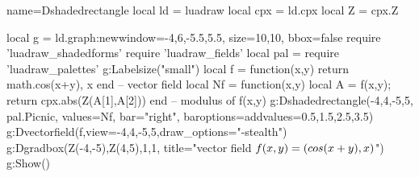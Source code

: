 \begin{luadraw}{name=Dshadedrectangle}
local ld = luadraw
local cpx = ld.cpx
local Z = cpx.Z

local g = ld.graph:new{window={-4,6,-5.5,5.5}, size={10,10}, bbox=false}
require 'luadraw_shadedforms'
require 'luadraw_fields'
local pal = require 'luadraw_palettes'
g:Labelsize("small")
local f = function(x,y) return {math.cos(x+y), x} end -- vector field
local Nf = function(x,y) local A = f(x,y); return cpx.abs(Z(A[1],A[2])) end -- modulus of f(x,y)
g:Dshadedrectangle(-4,4,-5,5, pal.Picnic, {values=Nf, bar="right", baroptions={addvalues={0.5,1.5,2.5,3.5}}})
g:Dvectorfield(f,{view={-4,4,-5,5},draw_options="-stealth"})
g:Dgradbox({Z(-4,-5),Z(4,5),1,1}, {title="vector field $f(x,y)=(\\cos(x+y),x)$"})
g:Show()
\end{luadraw}
